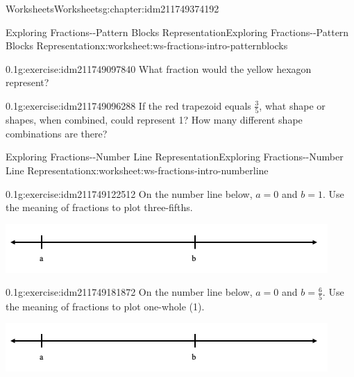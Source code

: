 \documentclass[twoside,11pt,]{book}
\begin{document}
\begin{chapterptx}{Worksheets}{}{Worksheets}{}{}{g:chapter:idm211749374192}
\begin{worksheet-section-numberless}{Exploring Fractions-{}-{}Pattern Blocks Representation}{}{Exploring Fractions-{}-{}Pattern Blocks Representation}{}{}{x:worksheet:ws-fractions-intro-patternblocks}
\begin{divisionexercise}{9}{}{0.1}{g:exercise:idm211749097840}
What fraction would the yellow hexagon represent?%
\end{divisionexercise}%
\begin{divisionexercise}{10}{}{0.1}{g:exercise:idm211749096288}%
If the red trapezoid equals \(\frac{3}{5} \), what shape or shapes, when combined, could represent 1?  How many different shape combinations are there?%
\end{divisionexercise}%
\end{worksheet-section-numberless}
\restoregeometry
%
%
\typeout{************************************************}
\typeout{************************************************}
%
\begin{worksheet-section-numberless}{Exploring Fractions-{}-{}Number Line Representation}{}{Exploring Fractions-{}-{}Number Line Representation}{}{}{x:worksheet:ws-fractions-intro-numberline}
\begin{divisionexercise}{1}{}{0.1}{g:exercise:idm211749122512}%
On the number line below, \(a= 0 \) and \(b=1 \).  Use the meaning of fractions to plot three-fifths.%
\begin{sidebyside}{1}{0}{0}{0}%
\begin{sbspanel}{1}%
\includegraphics[width=1\linewidth]{images/fractions-number-line.png}
\end{sbspanel}%
\end{sidebyside}%
\end{divisionexercise}%
\begin{divisionexercise}{2}{}{0.1}{g:exercise:idm211749181872}%
On the number line below, \(a= 0 \) and \(b=\frac{6}{5} \).  Use the meaning of fractions to plot one-whole (1).%
\begin{sidebyside}{1}{0}{0}{0}%
\begin{sbspanel}{1}%
\includegraphics[width=1\linewidth]{images/fractions-number-line.png}
\end{sbspanel}%
\end{sidebyside}%

\end{divisionexercise}
\end{worksheet-section-numberless}
\end{chapterptx}
\end{document}
